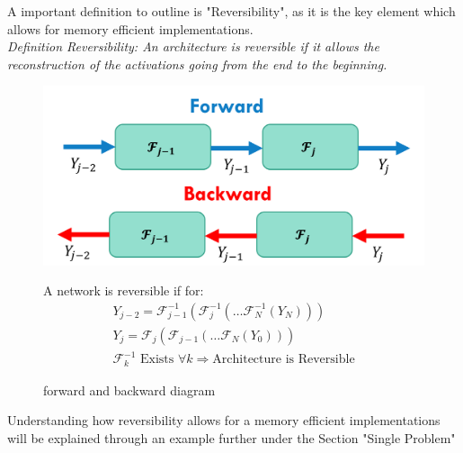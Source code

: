 \documentclass{article}
\theoremstyle{remark}
\begin{document}
\par 
    A important definition to outline is "Reversibility", as it is the key element which allows for memory efficient implementations.\\
\textit{Definition Reversibility: An architecture is reversible if it allows the reconstruction of the activations going from the end to the beginning.}

\begin{figure}[H]
    \centering
    \begin{minipage}{0.45\textwidth}
        \centering
        \includegraphics[scale=0.5]{imgs/revesibility_chart.png} %
        \caption{forward and backward diagram}
    \end{minipage}\hfill
    \begin{minipage}{0.45\textwidth}
        \centering
        A network is reversible if for:
        \begin{gather*}
            Y_{j-2} = \mathcal{F}^{-1}_{j-1}(\mathcal{F}^{-1}_{j}(\dots \mathcal{F}^{-1}_{N}(Y_N)))\\
            Y_j = \mathcal{F}_{j}(\mathcal{F}_{j-1}(\dots \mathcal{F}_{N}(Y_0))) \\
            \mathcal{F}^{-1}_{k} \text{ Exists } \forall k \Rightarrow \text{Architecture is Reversible}
        \end{gather*}
    \end{minipage}
\end{figure}

Understanding how reversibility allows for a memory efficient implementations will be explained through an example further under the Section "Single Problem"
\end{document}
